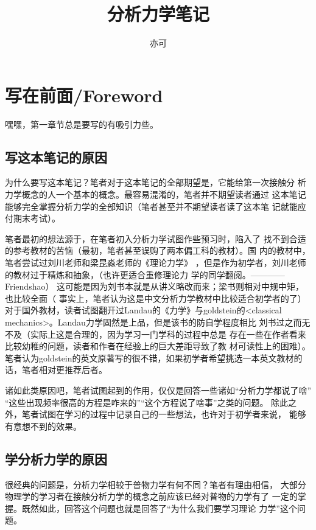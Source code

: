 \documentclass[a4paper, 10pt, openany]{book}%
\begin{document}
  \title{ \heiti 分析力学笔记}
  \author{亦可}
  \maketitle
  
 
\tableofcontents


  \newpage

  \chapter{写在前面/Foreword}

嘿嘿，第一章节总是要写的有吸引力些。
\section{写这本笔记的原因}
为什么要写这本笔记？笔者对于这本笔记的全部期望是，它能给第一次接触分
析力学概念的人一个基本的概念。最容易混淆的，笔者并不期望读者通过
这本笔记能够完全掌握分析力学的全部知识（笔者甚至并不期望读者读了这本笔
记就能应付期末考试）。

笔者最初的想法源于，在笔者初入分析力学试图作些预习时，陷入了
找不到合适的参考教材的苦恼（最初，笔者甚至误购了两本偏工科的教材）。国
内的教材中，笔者尝试过刘川老师和梁昆淼老师的《理论力学》
，但是作为初学者，刘川老师的教材过于精炼和抽象，（也许更适合重修理论力
学的同学翻阅。————Friendshao）
这可能是因为刘书本就是从讲义略改而来；梁书则相对中规中矩，也比较全面（
事实上，笔者认为这是中文分析力学教材中比较适合初学者的了）
对于国外教材，读者试图翻开过Landau的《力学》与goldstein的<classical 
mechanics>。Landau力学固然是上品，但是该书的防自学程度相比
刘书过之而无不及（实际上这是合理的，因为学习一门学科的过程中总是
存在一些在作者看来比较幼稚的问题，读者和作者在经验上的巨大差距导致了教
材可读性上的困难）。
笔者认为goldstein的英文原著写的很不错，如果初学者希望挑选一本英文教材的
话，笔者相对更推荐后者。

诸如此类原因吧，笔者试图起到的作用，仅仅是回答一些诸如“分析力学都说了啥”
“这些出现频率很高的方程是咋来的”“这个方程说了啥事”之类的问题。
除此之外，笔者试图在学习的过程中记录自己的一些想法，也许对于初学者来说，
能够有意想不到的效果。
\section{学分析力学的原因}
很经典的问题是，分析力学相较于普物力学有何不同？笔者有理由相信，
大部分物理学的学习者在接触分析力学的概念之前应该已经对普物的力学有了
一定的掌握。既然如此，回答这个问题也就是回答了“为什么我们要学习理论
力学”这个问题。
\end{document}
